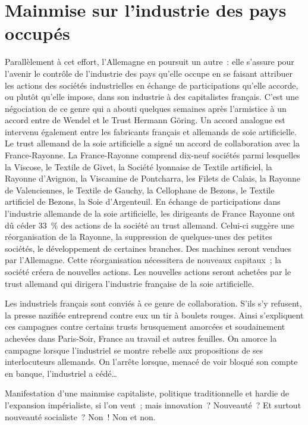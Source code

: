 \documentclass[french,twoside]{book} %
\begin{document}
\section[Mainmise sur l’industrie des pays occupés]{Mainmise sur l’industrie des pays occupés}
\noindent Parallèlement à cet effort, l’Allemagne en poursuit un autre : elle s’assure pour l’avenir le contrôle de l’industrie des pays qu’elle occupe en se faisant attribuer les actions des sociétés industrielles en échange de participations qu’elle accorde, ou plutôt qu’elle impose, dans son industrie à des capitalistes français. C’est une négociation de ce genre qui a abouti quelques semaines après l’armistice à un accord entre de Wendel et le Trust Hermann Göring. Un accord analogue est intervenu également entre les fabricants français et allemands de soie artificielle. Le trust allemand de la soie artificielle a signé un accord de collaboration avec la France-Rayonne. La France-Rayonne comprend dix-neuf sociétés parmi lesquelles la Viscose, le Textile de Givet, la Société lyonnaise de Textile artificiel, la Rayonne d’Avignon, la Viscamine de Pontcharra, les Filets de Calais, la Rayonne de Valenciennes, le Textile de Gauchy, la Cellophane de Bezons, le Textile artificiel de Bezons, la Soie d’Argenteuil. En échange de participations dans l’industrie allemande de la soie artificielle, les dirigeants de France Rayonne ont dû céder 33 \% des actions de la société au trust allemand. Celui-ci suggère une réorganisation de la Rayonne, la suppression de quelques-unes des petites sociétés, le développement de certaines branches. Des machines seront vendues par l’Allemagne. Cette réorganisation nécessitera de nouveaux capitaux ; la société créera de nouvelles actions. Les nouvelles actions seront achetées par le trust allemand qui dirigera l’industrie française de la soie artificielle.\par
Les industriels français sont conviés à ce genre de collaboration. S’ils s’y refusent, la presse nazifiée entreprend contre eux un tir à boulets rouges. Ainsi s’expliquent ces campagnes contre certains trusts brusquement amorcées et soudainement achevées dans Paris-Soir, France au travail et autres feuilles. On amorce la campagne lorsque l’industriel se montre rebelle aux propositions de ses interlocuteurs allemands. On l’arrête lorsque, menacé de voir bloqué son compte en banque, l’industriel a cédé…\par
Manifestation d’une mainmise capitaliste, politique traditionnelle et hardie de l’expansion impérialiste, si l’on veut ; mais innovation ? Nouveauté ? Et surtout nouveauté socialiste ? Non ! Non et non.
\end{document}
